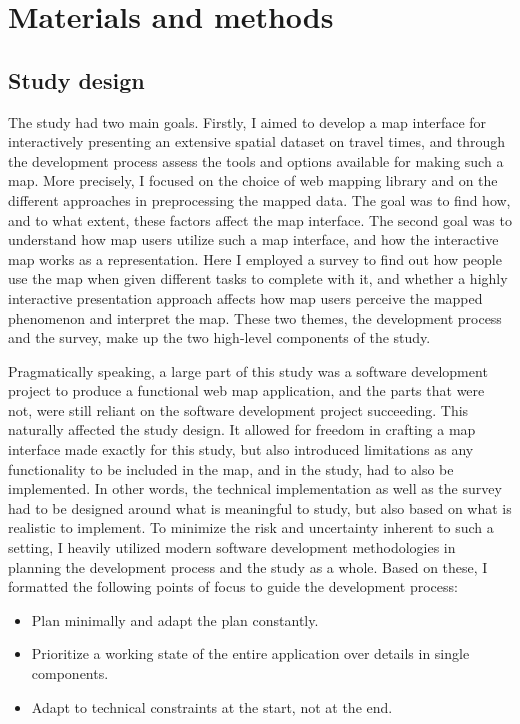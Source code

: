 \section{Materials and methods}

\subsection{Study design}

The study had two main goals.
Firstly, I aimed to develop a map interface for
interactively presenting an extensive spatial dataset on travel times,
and through the development process assess
the tools and options available for making such a map.
More precisely,
I focused on the choice of web mapping library
and on the different approaches in preprocessing the mapped data.
The goal was to find how,
and to what extent,
these factors affect the map interface.
The second goal was to understand how map users utilize such a map interface,
and how the interactive map works as a representation.
Here I employed a survey to find out how
people use the map when given different tasks to complete with it,
and whether a highly interactive presentation approach affects
how map users perceive the mapped phenomenon and interpret the map.
These two themes, the development process and the survey,
make up the two high-level components of the study.


Pragmatically speaking, a large part of this study was
a software development project to produce a functional web map application,
and the parts that were not, were still reliant on
the software development project succeeding.
This naturally affected the study design.
It allowed for freedom in crafting a map interface made exactly for this study,
but also introduced limitations
as any functionality to be included in the map, and in the study,
had to also be implemented.
In other words, the technical implementation as well as the survey
had to be designed around what is meaningful to study,
but also based on what is realistic to implement.
To minimize the risk and uncertainty inherent to such a setting,
I heavily utilized modern software development methodologies
\parencite{saq2020, bec2001, sha2017, kuh2017}
in planning the development process and the study as a whole.
Based on these,
I formatted the following points of focus
to guide the development process:
\begin{itemize}
	\item Plan minimally and adapt the plan constantly.
	\item Prioritize a working state of the entire application over details in single components.
	\item Adapt to technical constraints at the start, not at the end.
\end{itemize}

